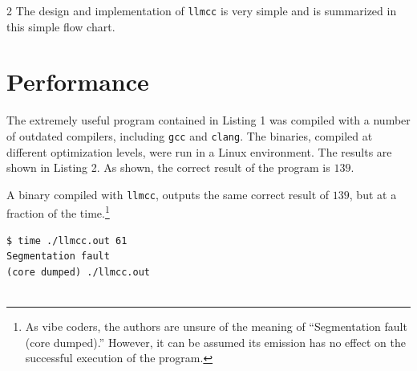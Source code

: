 \documentclass{article}
\newcommand{\llmcc}{\texttt{llmcc}}
\begin{document}
\begin{multicols}{2}
The design and implementation of \llmcc{} is very simple and is summarized in this simple flow chart.

\begin{center}
\end{center}

%

\section{Performance}

The extremely useful program contained in Listing 1 was compiled with a number of outdated compilers, including \texttt{gcc} and \texttt{clang}. The binaries, compiled at different optimization levels, were run in a Linux environment. The results are shown in Listing 2. As shown, the correct result of the program is $139$.

A binary compiled with \llmcc{}, outputs the same correct result of $139$, but at a fraction of the time.\footnote{As vibe coders, the authors are unsure of the meaning of ``Segmentation fault (core dumped).'' However, it can be assumed its emission has no effect on the successful execution of the program.}
\begin{displayquote}
\begin{verbatim}
$ time ./llmcc.out 61
Segmentation fault
(core dumped) ./llmcc.out


\end{verbatim}
\end{displayquote}
\end{multicols}
\end{document}
